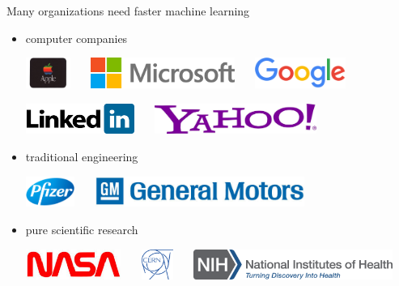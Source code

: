 \begin{frame}{Many organizations need faster machine learning}

\begin{itemize}
\item 
computer companies

\vspace{0.05in}
\includegraphics[height=1cm]{img-presentation/apple}~~~
\includegraphics[height=1cm]{img-presentation/ms}~~~
\includegraphics[height=1cm]{img-presentation/google}

\vspace{0.05in}
\includegraphics[height=1cm]{img-presentation/linkedin}~~~
\includegraphics[height=1cm]{img-presentation/yahoo}

\pause
\vspace{0.1in}
\item
traditional engineering

\vspace{0.05in}
\includegraphics[height=1cm]{img-presentation/pfizer}~~~
\includegraphics[height=1cm]{img-presentation/gm}

\pause
\vspace{0.1in}
\item 
pure scientific research

\vspace{0.05in}
\includegraphics[height=1cm]{img-presentation/nasa}~~~
\includegraphics[height=1cm]{img-presentation/cern}~~~
\includegraphics[height=1cm]{img-presentation/nih}


\end{itemize}
\end{frame}
